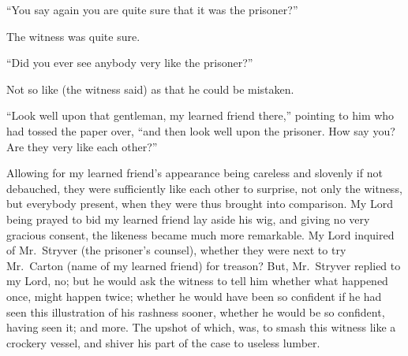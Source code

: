 ``You say again you are quite sure that it was the prisoner?''

The witness was quite sure.

``Did you ever see anybody very like the prisoner?''

Not so like (the witness said) as that he could be mistaken.

``Look well upon that gentleman, my learned friend there,'' pointing to
him who had tossed the paper over, ``and then look well upon the prisoner.
How say you?  Are they very like each other?''

Allowing for my learned friend's appearance being careless and
slovenly if not debauched, they were sufficiently like each other to
surprise, not only the witness, but everybody present, when they were
thus brought into comparison.  My Lord being prayed to bid my learned
friend lay aside his wig, and giving no very gracious consent, the
likeness became much more remarkable.  My Lord inquired of Mr.\ Stryver
(the prisoner's counsel), whether they were next to try Mr.\ Carton
(name of my learned friend) for treason?  But, Mr.\ Stryver replied to
my Lord, no; but he would ask the witness to tell him whether what
happened once, might happen twice; whether he would have been so
confident if he had seen this illustration of his rashness sooner,
whether he would be so confident, having seen it; and more.
The upshot of which, was, to smash this witness like a crockery vessel,
and shiver his part of the case to useless lumber.


